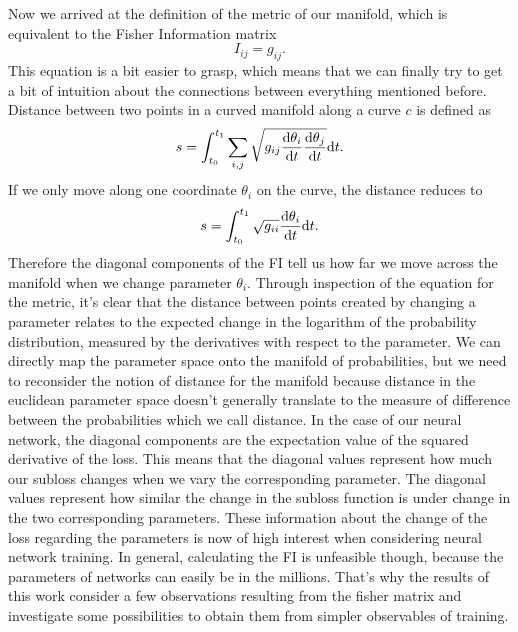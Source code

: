 Now we arrived at the definition of the metric of our manifold, which is equivalent to the Fisher Information matrix
\begin{equation}
	I_{ij} = g_{ij}.
\end{equation}
This equation is a bit easier to grasp, which means that we can finally try to get a bit of intuition about the connections between everything mentioned before. Distance between two points in a curved manifold along a curve $c$ is defined as 
\begin{equation}
	s = \int_{t_0}^{t_1} \sum_{i,j} \sqrt{g_{ij}\frac{\mathrm{d}\theta_i}{\mathrm{d}t}\frac{\mathrm{d}\theta_j}{\mathrm{d}t}} \mathrm{d}t. 
\end{equation}
If we only move along one coordinate $\theta_i$ on the curve, the distance reduces to 
\begin{equation}
	s = \int_{t_0}^{t_1} \sqrt{g_{ii}}\frac{\mathrm{d}\theta_i}{\mathrm{d}t} \mathrm{d}t. 
\end{equation}
Therefore the diagonal components of the FI tell us how far we move across the manifold when we change parameter $\theta_i$. Through inspection of the equation for the metric, it's clear that the distance between points created by changing a parameter relates to the expected change in the logarithm of the probability distribution, measured by the derivatives with respect to the parameter. We can directly map the parameter space onto the manifold of probabilities, but we need to reconsider the notion of distance for the manifold because distance in the euclidean parameter space doesn't generally translate to the measure of difference between the probabilities which we call distance. In the case of our neural network, the diagonal components are the expectation value of the squared derivative of the loss. This means that the diagonal values represent how much our subloss changes when we vary the corresponding parameter. The diagonal values represent how similar the change in the subloss function is under change in the two corresponding parameters. These information about the change of the loss regarding the parameters is now of high interest when considering neural network training. In general, calculating the FI is unfeasible though, because the parameters of networks can easily be in the millions. That's why the results of this work consider a few observations resulting from the fisher matrix and investigate some possibilities to obtain them from simpler observables of training.